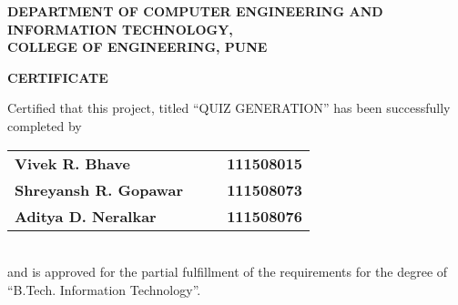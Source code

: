 % 
\thispagestyle{empty}
\linespread{2}
\begin{center}			%
	\Large{\bf{DEPARTMENT OF COMPUTER ENGINEERING AND\\  INFORMATION TECHNOLOGY,\\ 
	       COLLEGE OF ENGINEERING, PUNE\\}}	
\end{center}

\vspace{20pt}			%

\begin{center}
	\Large{\bf{CERTIFICATE\\}}
\end{center}

\vspace{20pt}

\linespread{1.5}			%
\selectfont
\large{
Certified that this project, titled ``QUIZ GENERATION''
has been successfully completed by \\ 
\begin{table}[htbp]
	\begin{center}
	\begin{tabular}{ l c c l }
	\Large\bf{Vivek R. Bhave} & & & \Large\bf{111508015} \\ [0.3cm]
	\Large\bf{Shreyansh R. Gopawar} & & & \Large\bf{111508073} \\ [0.3cm]
 	\Large\bf{Aditya D. Neralkar} & & & \Large\bf{111508076} \\ [0.3cm]
	\end{tabular}
	\end{center}
	\end{table} \\
and is approved for the partial fulfillment of the requirements for the degree of 
``B.Tech. Information Technology''.
}


